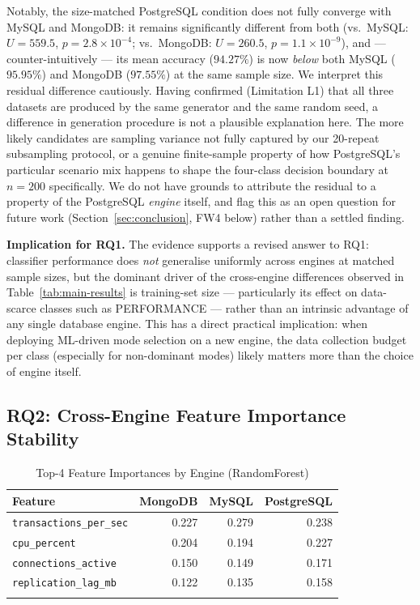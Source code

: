 \documentclass[pdflatex,sn-mathphys-num]{sn-jnl}
\theoremstyle{thmstyleone}
\theoremstyle{thmstylethree}
\begin{document}
Notably, the size-matched PostgreSQL condition does not fully converge
with MySQL and MongoDB: it remains significantly different from both
(vs.\ MySQL: $U=559.5$, $p=2.8\times10^{-4}$; vs.\ MongoDB:
$U=260.5$, $p=1.1\times10^{-9}$), and --- counter-intuitively --- its
mean accuracy ($94.27\%$) is now \emph{below} both MySQL ($95.95\%$)
and MongoDB ($97.55\%$) at the same sample size. We interpret this
residual difference cautiously. Having confirmed (Limitation L1) that
all three datasets are produced by the same generator and the same
random seed, a difference in generation procedure is not a plausible
explanation here. The more likely candidates are sampling variance not
fully captured by our 20-repeat subsampling protocol, or a genuine
finite-sample property of how PostgreSQL's particular scenario mix
happens to shape the four-class decision boundary at $n=200$
specifically. We do not have grounds to attribute the residual to a
property of the PostgreSQL \emph{engine} itself, and flag this as an
open question for future work (Section~\ref{sec:conclusion}, FW4
below) rather than a settled finding.

\textbf{Implication for RQ1.} The evidence supports a revised answer
to RQ1: classifier performance does \emph{not} generalise uniformly
across engines at matched sample sizes, but the dominant driver of the
cross-engine differences observed in Table~\ref{tab:main-results} is
training-set size --- particularly its effect on data-scarce classes
such as PERFORMANCE --- rather than an intrinsic advantage of any
single database engine. This has a direct practical implication: when
deploying ML-driven mode selection on a new engine, the data
collection budget per class (especially for non-dominant modes) likely
matters more than the choice of engine itself.

\subsection{RQ2: Cross-Engine Feature Importance Stability}\label{subsec:rq2}

\begin{table}[h]
\caption{Top-4 Feature Importances by Engine (RandomForest)}\label{tab:feature-importance}
\begin{tabular}{@{}lrrr@{}}
\toprule
Feature & MongoDB & MySQL & PostgreSQL \\
\midrule
\texttt{transactions\_per\_sec} & 0.227 & 0.279 & 0.238 \\
\texttt{cpu\_percent}           & 0.204 & 0.194 & 0.227 \\
\texttt{connections\_active}    & 0.150 & 0.149 & 0.171 \\
\texttt{replication\_lag\_mb}   & 0.122 & 0.135 & 0.158 \\
\botrule
\end{tabular}
\end{table}
\end{document}
